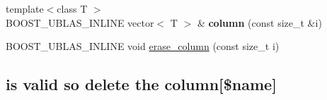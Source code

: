 \begin{DoxyCompactItemize}
\item 
{\footnotesize template$<$class T $>$ }\\B\+O\+O\+S\+T\+\_\+\+U\+B\+L\+A\+S\+\_\+\+I\+N\+L\+I\+NE vector$<$ T $>$ \& {\bfseries column} (const size\+\_\+t \&i)\hypertarget{classboost_1_1numeric_1_1ublas_1_1data__frame_ac7a4a31485c55e9b3254e1e62ea4c7a8}{}\label{classboost_1_1numeric_1_1ublas_1_1data__frame_ac7a4a31485c55e9b3254e1e62ea4c7a8}

\item 
B\+O\+O\+S\+T\+\_\+\+U\+B\+L\+A\+S\+\_\+\+I\+N\+L\+I\+NE void \hyperlink{classboost_1_1numeric_1_1ublas_1_1data__frame_a751e376399080f1c09ddf8ad1e11e478}{erase\+\_\+column} (const size\+\_\+t i)
\end{DoxyCompactItemize}
\subsection*{is valid so delete the column\mbox{[}\$name\mbox{]}}
\label{_amgrpc6b17b382216a655e548a62040c929a3}%
